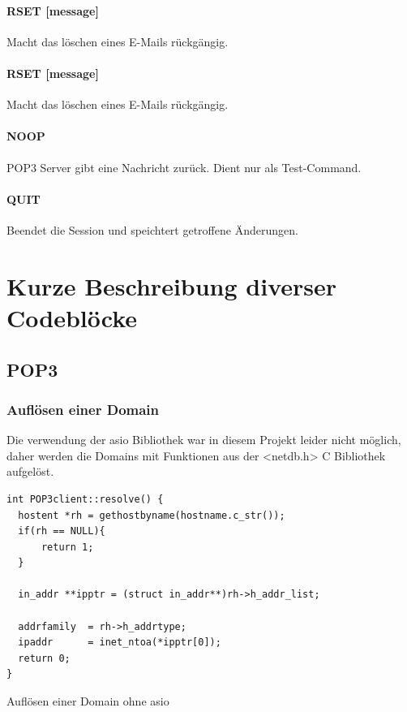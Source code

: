 \documentclass[12pt, letterpaper]{article}
\newenvironment{code}{\captionsetup{type=listing}}{}
\begin{document}
\paragraph{RSET [message]}
Macht das löschen eines E-Mails rückgängig.

\paragraph{RSET [message]}
Macht das löschen eines E-Mails rückgängig.

\paragraph{NOOP}
POP3 Server gibt eine Nachricht zurück. Dient nur als Test-Command.

\paragraph{QUIT}
Beendet die Session und speichtert getroffene Änderungen.

\section{Kurze Beschreibung diverser Codeblöcke}

\subsection{POP3}

\subsubsection{Auflösen einer Domain}

Die verwendung der asio Bibliothek war in diesem Projekt leider nicht möglich, daher werden die Domains mit Funktionen aus der <netdb.h> C Bibliothek aufgelöst.

\begin{code}
\begin{verbatim}
int POP3client::resolve() {
  hostent *rh = gethostbyname(hostname.c_str());
  if(rh == NULL){
      return 1;
  }

  in_addr **ipptr = (struct in_addr**)rh->h_addr_list;

  addrfamily  = rh->h_addrtype;
  ipaddr      = inet_ntoa(*ipptr[0]);
  return 0;
}
\end{verbatim}
\caption{Auflösen einer Domain ohne asio}
\label{resolve_domain}
\end{code}
\end{document}
